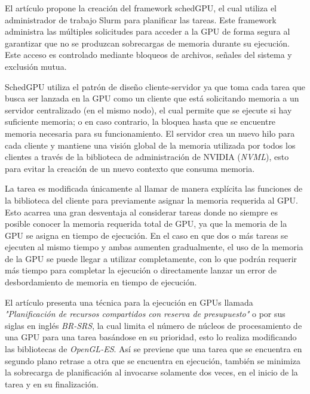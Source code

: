 El artículo \cite{IntraNode} propone la creación del framework schedGPU, el cual utiliza el administrador de trabajo Slurm para planificar las tareas. Este framework administra las múltiples solicitudes para acceder a la GPU de forma segura al garantizar que no se produzcan sobrecargas de memoria durante su ejecución. 
Este acceso es controlado mediante bloqueos de archivos, señales del sistema y exclusión mutua.
\newline

SchedGPU utiliza el patrón de diseño cliente-servidor ya que toma cada tarea que busca ser lanzada en la GPU como un cliente que está solicitando memoria a un servidor centralizado (en el mismo nodo), el cual permite que se ejecute si hay suficiente memoria; o en caso contrario, la bloquea hasta que se encuentre memoria necesaria para su funcionamiento. 
El servidor crea un nuevo hilo para cada cliente y mantiene una visión global de la memoria utilizada por todos los clientes a través de la biblioteca de administración de NVIDIA (\textit{NVML})\cite{TORQUE}, esto para evitar la creación de un nuevo contexto que consuma memoria.

La tarea es modificada únicamente al llamar  de manera explícita las funciones de la biblioteca del cliente para previamente asignar la memoria requerida al GPU. Esto acarrea una gran desventaja al considerar tareas donde no siempre es posible conocer la memoria requerida total de GPU, ya que la memoria de la GPU se asigna en tiempo de ejecución. 
En el caso en que dos o más tareas se ejecuten al mismo tiempo y ambas aumenten gradualmente, el uso de la memoria de la GPU se puede llegar a utilizar completamente, con lo que podrán requerir más tiempo para completar la ejecución o directamente lanzar un error de desbordamiento de memoria en tiempo de ejecución.
\newline	
	
	El artículo \cite{Pridriven} presenta una técnica para la ejecución en GPUs llamada \textit{"Planificación de recursos compartidos con reserva de presupuesto"} o por sus siglas en inglés \textit{BR-SRS}, la cual limita el número de núcleos de procesamiento de una GPU para una tarea basándose en su prioridad, esto lo realiza modificando las bibliotecas de  \textit{OpenGL-ES}. 
	Así se previene que una tarea que se encuentra en segundo plano retrase a otra que se encuentra en ejecución, también se minimiza la sobrecarga de planificación al invocarse solamente dos veces, en el inicio de la tarea y en su finalización.

